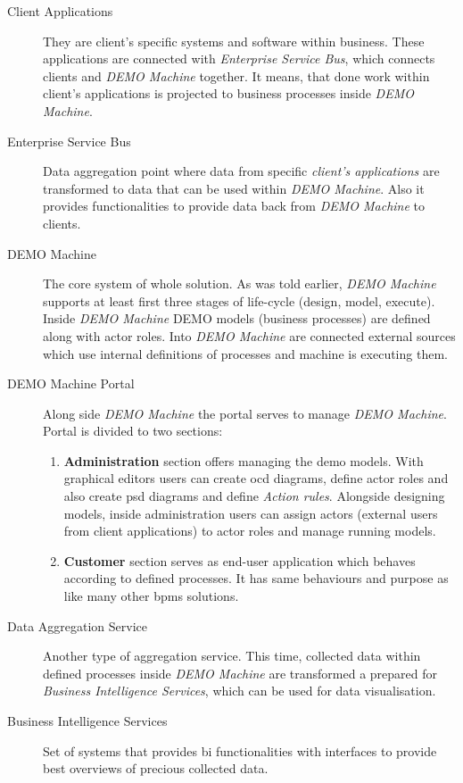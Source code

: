 \begin{description}
	\item[Client Applications] They are client's specific systems and software within business. These applications are connected with \textit{Enterprise Service Bus}, which connects clients and \textit{DEMO Machine} together. It means, that done work within client's applications is projected to business processes inside \textit{DEMO Machine}.
    
    \item[Enterprise Service Bus] Data aggregation point where data from specific \textit{client's applications} are transformed to data that can be used within \textit{DEMO Machine}. Also it provides functionalities to provide data back from \textit{DEMO Machine} to clients.
	
    \item[DEMO Machine] The core system of whole solution. As was told earlier, \textit{DEMO Machine} supports at least first three stages of life-cycle (design, model, execute). Inside \textit{DEMO Machine} DEMO models (business processes) are defined along with actor roles. Into \textit{DEMO Machine} are connected external sources which use internal definitions of processes and machine is executing them. 
    
    \item[DEMO Machine Portal] Along side \textit{DEMO Machine} the portal serves to manage \textit{DEMO Machine}. Portal is divided to two sections:  
    
    \begin{enumerate}
    \item \textbf{Administration} section offers managing the \gls{demo} models. With graphical editors users can create \gls{ocd} diagrams, define actor roles and also create \gls{psd} diagrams and define \textit{Action rules}. Alongside designing models, inside administration users can assign actors (external users from client applications) to actor roles and manage running models.
    
    \item \textbf{Customer} section serves as end-user application which behaves according to defined processes. It has same behaviours and purpose as like many other \gls{bpms} solutions.
    \end{enumerate}
    
    \item[Data Aggregation Service] Another type of aggregation service. This time, collected data within defined processes inside \textit{DEMO Machine} are transformed a prepared for \textit{Business Intelligence Services}, which can be used for data visualisation.
    
    \item[Business Intelligence Services] Set of systems that provides \gls{bi} functionalities with interfaces to provide best overviews of precious collected data.   
\end{description}

